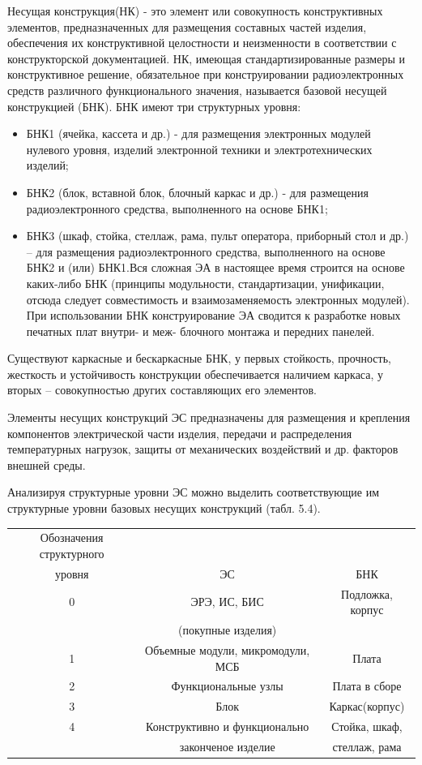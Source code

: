 \documentclass[unicode, 12pt, a4paper, oneside]{article}
\begin{document}
Несущая конструкция(НК) - это элемент или совокупность конструктивных элементов, предназначенных для размещения составных частей изделия, обеспечения их конструктивной целостности и неизменности в соответствии с конструкторской документацией. НК, имеющая стандартизированные размеры и конструктивное решение, обязательное при конструировании радиоэлектронных средств различного функционального значения, называется базовой несущей конструкцией (БНК). БНК имеют три структурных уровня:
\begin{itemize}
\item  БНК1 (ячейка, кассета и др.) - для размещения электронных модулей нулевого уровня, изделий электронной техники и электротехнических изделий;
\item БНК2 (блок, вставной блок, блочный каркас и др.) - для размещения радиоэлектронного средства, выполненного на основе БНК1;
\item БНК3 (шкаф, стойка, стеллаж, рама, пульт оператора, приборный стол и др.) – для размещения радиоэлектронного средства, выполненного на основе БНК2 и (или) БНК1.Вся сложная ЭА в настоящее время строится на основе каких-либо БНК (принципы модульности, стандартизации, унификации, отсюда следует совместимость и взаимозаменяемость электронных модулей). При использовании БНК конструирование ЭА сводится к разработке новых печатных плат внутри- и меж- блочного монтажа и передних панелей.
\end{itemize}

Существуют каркасные и бескаркасные БНК, у первых стойкость, прочность, жесткость и устойчивость конструкции обеспечивается наличием каркаса, у вторых – совокупностью других составляющих его элементов.

Элементы несущих конструкций ЭС предназначены для размещения и крепления компонентов электрической части изделия, передачи и распределения температурных нагрузок, защиты от механических воздействий и др. факторов внешней среды.
    
Анализируя структурные уровни ЭС можно выделить соответствующие им структурные уровни базовых несущих конструкций (табл. 5.4).
\begin{center}
\begin{tabular}{|c|c|c|}
\hline Обозначения структурного& &\\ уровня & ЭС & БНК \\  
\hline 0 & ЭРЭ, ИС, БИС & Подложка, корпус \\  &(покупные изделия) & \\
\hline 1 & Объемные модули, микромодули, МСБ & Плата\\
\hline 2 & Функциональные узлы & Плата в сборе\\
\hline 3 & Блок & Каркас(корпус)\\
\hline 4 & Конструктивно и функционально & Стойка, шкаф, \\ & законченое изделие &  стеллаж, рама\\
\hline
\end{tabular}
\end{center}
\end{document}
